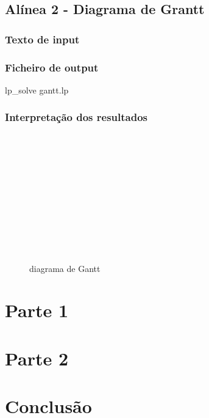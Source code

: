 \documentclass[a4paper]{report}
\begin{document}
\pagebreak
\section{Alínea 2 - Diagrama de Grantt}

\subsection{Texto de input}
\label{input}


\subsection{Ficheiro de output}
\label{output}
\bash[stdout]
lp_solve gantt.lp
\END


\subsection{Interpretação dos resultados}

\begin{figure}[H]
    \centering
    \begin{ganttchart}{1}{27}
        \\
        \\

        \\
        \\
        \\
        
        \\
        \\
        
        \\
        
        \\
        
        \\
    \end{ganttchart}
    \caption{diagrama de Gantt}
\end{figure}




\chapter{Parte 1}




\chapter{Parte 2}








\chapter{Conclusão}
\end{document}
